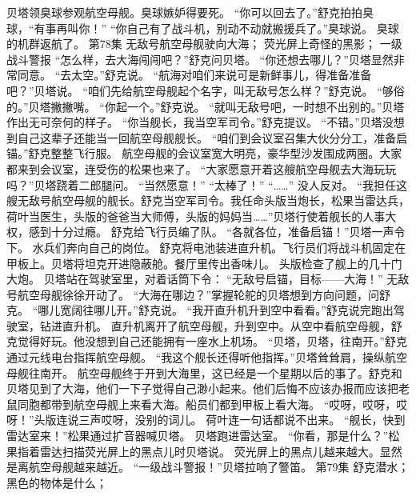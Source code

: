 \documentclass[a4paper,12pt,UTF8,twoside]{ctexbook}
\begin{document}
        贝塔领臭球参观航空母舰。臭球嫉妒得要死。 
        “你可以回去了。”舒克拍拍臭球，“有事再叫你！” 
        “你自己有了战斗机，别动不动就搬援兵了。”臭球说。 
        臭球的机群返航了。   第78集 
        无敌号航空母舰驶向大海； 
        荧光屏上奇怪的黑影； 
        一级战斗警报   
        “怎么样，去大海闯闯吧？”舒克问贝塔。 
        “你还想去哪儿？”贝塔显然非常同意。 
        “去太空。”舒克说。 
        “航海对咱们来说可是新鲜事儿，得准备准备吧？”贝塔说。 
        “咱们先给航空母舰起个名字，叫无敌号怎么样？”舒克说。 
        “够俗的。”贝塔撇撇嘴。 
        “你起一个。”舒克说。 
        “就叫无敌号吧，一时想不出别的。”贝塔作出无可奈何的样子。 
        “你当舰长，我当空军司令。”舒克提议。 
        “不错。”贝塔没想到自己这辈子还能当一回航空母舰舰长。 
        “咱们到会议室召集大伙分分工，准备启锚。”舒克整整飞行服。 
        航空母舰的会议室宽大明亮，豪华型沙发围成两圈。大家都来到会议室，连受伤的松果也来了。 
        “大家愿意开着这艘航空母舰去大海玩玩吗？”贝塔跷着二郎腿问。 
        “当然愿意！” 
        “太棒了！” 
        “……” 
        没人反对。 
        “我担任这艘无敌号航空母舰的舰长。舒克当空军司令。我任命头版当炮长，松果当雷达兵，荷叶当医生，头版的爸爸当大师傅，头版的妈妈当……”贝塔行使着舰长的人事大权，感到十分过瘾。 
        舒克给飞行员编了队。 
        “各就各位，准备启锚！”贝塔一声令下。 
        水兵们奔向自己的岗位。 
        舒克将电池装进直升机。飞行员们将战斗机固定在甲板上。贝塔将坦克开进隐蔽舱。餐厅里传出香味儿。 
        头版检查了舰上的几十门大炮。 
        贝塔站在驾驶室里，对着话筒下令： 
        “无敌号启锚，目标——大海！” 
        无敌号航空母舰徐徐开动了。 
        “大海在哪边？”掌握轮舵的贝塔想到方向问题，问舒克。 
        “哪儿宽阔往哪儿开。”舒克说。 
        “我开直升机升到空中看看。”舒克说完跑出驾驶室，钻进直升机。 
        直升机离开了航空母舰，升到空中。从空中看航空母舰，舒克觉得好玩。他没想到自己还能拥有一座水上机场。 
        “贝塔，贝塔，往南开。”舒克通过元线电台指挥航空母舰。 
        “我这个舰长还得听他指挥。”贝塔耸耸肩，操纵航空母舰往南开。 
        航空母舰终于开到大海里，这已经是一个星期以后的事了。舒克和贝塔见到了大海，他们一下子觉得自己渺小起来。他们后悔不应该办报而应该把老鼠同胞都带到航空母舰上来看大海。船员们都到甲板上看大海。 
        “哎呀，哎呀，哎呀！”头版连说三声哎呀，没别的词儿。 
        荷叶连一句话都说不出来。 
      “舰长，快到雷达室来！”松果通过扩音器喊贝塔。 
        贝塔跑进雷达室。 
        “你看，那是什么？”松果指着雷达扫描荧光屏上的黑点儿时贝塔说。 
        荧光屏上的黑点儿越来越大。显然是离航空母舰越来越近。 
        “一级战斗警报！”贝塔拉响了警笛。   第79集 
        舒克潜水； 
        黑色的物体是什么； 
\end{document}

